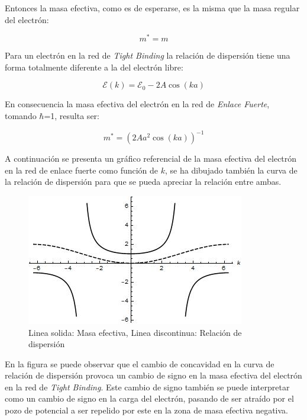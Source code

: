 Entonces la masa efectiva, como es de esperarse, es la misma que la masa regular del electrón:

\begin{equation}\label{eq:7.5}
    m^*=m
\end{equation}

Para un electrón en la red de \textit{Tight Binding} la relación de dispersión tiene una forma totalmente diferente a la del electrón libre:

\begin{equation}\label{eq:7.6}
    \mathcal{E}(k)=\mathcal{E}_0-2A\cos(ka)
\end{equation}

En consecuencia la masa efectiva del electrón en la red de \textit{Enlace Fuerte}, tomando $\hbar$=1, resulta ser:

\begin{equation}\label{eq:7.7}
    m^*=(2Aa^2\cos(ka))^{-1}
\end{equation}

A continuación se presenta un gráfico referencial de la masa efectiva del electrón en la red de enlace fuerte como función de $k$, se ha dibujado también la curva de la relación de dispersión para que se pueda apreciar la relación entre ambas.

\begin{figure}[H]
    \centering
    \includegraphics{imagenes/masa-efectiva.jpg}
    \caption{Linea solida: Masa efectiva, Linea discontinua: Relación de dispersión}
    \label{fig:my_label}
\end{figure}

En la figura se puede observar que el cambio de concavidad en la curva de relación de dispersión provoca un cambio de signo en la masa efectiva del electrón en la red de \textit{Tight Binding}. Este cambio de signo también se puede interpretar como un cambio de signo en la carga del electrón, pasando de ser atraído por el pozo de potencial a ser repelido por este en la zona de masa efectiva negativa.


